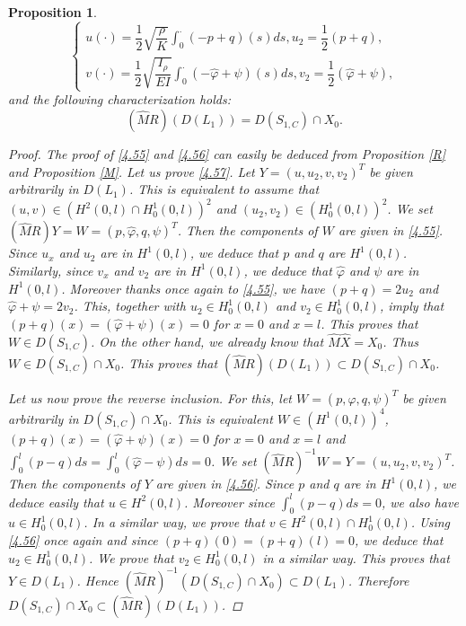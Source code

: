 \documentclass[10pt, english]{article}
\newtheorem{prop}[thm]{Proposition}
\begin{document}
{\begin{prop}
\begin{equation}
\begin{cases}
\displaystyle{u(\cdot)=\dfrac{1}{2}\sqrt{\dfrac{\rho}{K}}\int_0^{\cdot}(-p+q)(s)ds, u_2= \dfrac{1}{2}(p+q)},\\
\displaystyle{v(\cdot)=\dfrac{1}{2} \sqrt{\dfrac{I_{\rho}}{EI}}\int_0^{\cdot}(-\widehat{\varphi}+\psi)(s)ds, v_2=\dfrac{1}{2}(\widehat{\varphi}+\psi)},
\end{cases}
\end{equation}
and the following characterization holds:
\begin{equation}\label{4.57}
(\widehat{M}R)(D(L_1))=D(S_{1,C})\cap X_0.
\end{equation}
\begin{proof}
The proof of \eqref{4.55} and \eqref{4.56} can easily be deduced from Proposition \ref{R} and Proposition \ref{M}. Let us prove \eqref{4.57}. Let $Y=(u,u_2,v,v_2)^T$ be given arbitrarily in $D(L_1)$. This is equivalent to assume that $(u,v) \in (H^2(0,l)\cap H^1_0(0,l))^2$ and $(u_2,v_2) \in (H^1_0(0,l))^2$. We set $(\widehat{M}R)Y=W=(p,\widehat{\varphi}, q, \psi)^T$. Then the components of $W$ are given in \eqref{4.55}. Since $u_x$ and $u_2$ are in $H^1(0,l)$, we deduce that $p$ and $q$ are $H^1(0,l)$. Similarly, since $v_x$ and $v_2$ are in $H^1(0,l)$, we deduce that $\widehat{\varphi}$ and $\psi$ are in $H^1(0,l)$. Moreover thanks once again to \eqref{4.55}, we have $(p+q)=2u_2$ and $\widehat{\varphi} + \psi=2v_2$. This, together with $u_2 \in H^1_0(0,l)$ and $v_2 \in H^1_0(0,l)$, imply that $(p+q)(x)=(\widehat{\varphi} + \psi)(x)=0$ for $x=0$ and $x=l$. This proves that $W \in D(S_{1,C})$. On the other hand, we already know that $\widehat{M}\widehat{X}=X_0$. Thus $W \in D(S_{1,C})\cap X_0$. This proves that $(\widehat{M}R)(D(L_1))\subset D(S_{1,C})\cap X_0$. 

Let us now prove the reverse inclusion. For this, let 
$W=(p,\widehat{\varphi}, q, \psi)^T$ be given arbitrarily in $D(S_{1,C})\cap X_0$. This is equivalent $W \in (H^1(0,l))^4$, 
$(p+q)(x)=(\widehat{\varphi} + \psi)(x)=0$ for $x=0$ and $x=l$ and $\int_0^l(p-q)ds=\int_0^l(\widehat{\varphi}-\psi)ds=0$. We set $(\widehat{M}R)^{-1}W=Y=(u,u_2,v,v_2)^T$. Then the components of $Y$ are given in \eqref{4.56}. Since $p$ and $q$ are in $H^1(0,l)$, we deduce easily that $u \in H^2(0,l)$. Moreover since $\int_0^l(p-q)ds=0$, we also have $u \in H^1_0(0,l)$. In a similar way, we  prove that $v \in H^2(0,l) \cap H^1_0(0,l)$. Using \eqref{4.56} once again and since $(p+q)(0)=(p+q)(l)=0$, we deduce that $u_2 \in H^1_0(0,l)$. We prove that $v_2 \in H^1_0(0,l)$ in a similar way. This proves that $Y \in D(L_1)$. Hence 
$(\widehat{M}R)^{-1}(D(S_{1,C})\cap X_0) \subset D(L_1)$. Therefore $D(S_{1,C})\cap X_0 \subset (\widehat{M}R)(D(L_1))$.
\end{proof}
\end{prop}

}
\end{document}
